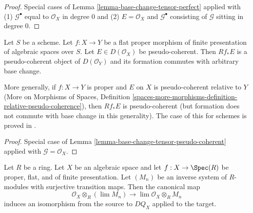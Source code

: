\begin{proof}
Special cases of
Lemma \ref{lemma-base-change-tensor-perfect} applied with
(1) $\mathcal{G}^\bullet$ equal to $\mathcal{O}_X$ in degree $0$
and (2) $E = \mathcal{O}_X$ and $\mathcal{G}^\bullet$ consisting
of $\mathcal{G}$ sitting in degree $0$.
\end{proof}

\begin{lemma}
\label{lemma-flat-proper-pseudo-coherent-direct-image-general}
Let $S$ be a scheme. Let $f : X \to Y$ be a flat proper
morphism of finite presentation of algebraic spaces over $S$.
Let $E \in D(\mathcal{O}_X)$
be pseudo-coherent. Then $Rf_*E$ is a pseudo-coherent object of
$D(\mathcal{O}_Y)$ and its formation commutes with arbitrary base change.
\end{lemma}

\noindent
More generally, if $f : X \to Y$ is proper and $E$ on $X$ is pseudo-coherent
relative to $Y$ (More on Morphisms of Spaces, Definition
\ref{spaces-more-morphisms-definition-relative-pseudo-coherence}),
then $Rf_*E$ is pseudo-coherent
(but formation does not commute with base change in this generality).
The case of this for schemes is proved in \cite{Kiehl}.

\begin{proof}
Special case of
Lemma \ref{lemma-base-change-tensor-pseudo-coherent} applied with
$\mathcal{G} = \mathcal{O}_X$.
\end{proof}

\begin{lemma}
\label{lemma-pullback-and-limits}
Let $R$ be a ring. Let $X$ be an algebraic space and let
$f : X \to \Spec(R)$ be proper, flat, and
of finite presentation. Let $(M_n)$ be an inverse
system of $R$-modules with surjective transition maps.
Then the canonical map
$$
\mathcal{O}_X \otimes_R (\lim M_n)
\longrightarrow
\lim \mathcal{O}_X \otimes_R M_n
$$
induces an isomorphism from the source to $DQ_X$ applied to the target.
\end{lemma}

